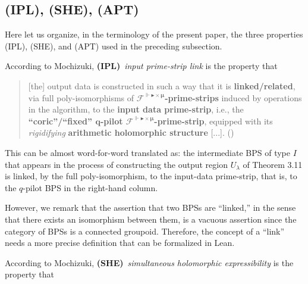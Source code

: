 \documentclass[12pt, reqno, a4paper]{amsart}
\def\cF{{\mathcal{F}}}
\def\bFmrts{\cF^{\Vdash\blacktriangleright\times\bm{\mu}}}
\begin{document}
\subsection{(IPL), (SHE), (APT)}\label{sub:IPLSHEAPTPrecise}
Here let us organize, in the terminology of the present paper, the three properties (IPL), (SHE), and (APT) used in the preceding subsection.

\medskip\noindent
According to Mochizuki, {\bf (IPL)}\ \emph{input prime-strip link} is the property that 

\medskip\begin{quote}
[the] output data is constructed in such a way that it is {\bf
linked/related}, via full poly-isomorphisms of {\bf
$\bFmrts$-prime-strips} induced by operations in the algorithm, to the
{\bf input data prime-strip}, i.e., the {\bf ``coric''/``fixed''
$\bm{q}$-pilot $\bFmrts$-prime-strip}, equipped with its {\it rigidifying}
{\bf arithmetic holomorphic structure} [...]. (\cite[Rem.\ 3.11.1(iii), p.\ 582]{MR4225475})
\end{quote}

\medskip
This can be almost word-for-word translated as: the intermediate BPS of type $I$ that appears in the process of constructing the output region \(U_{\lambda}\) of Theorem 3.11 is linked, by the full poly-isomorphism, to the input-data prime-strip, that is, to the \(q\)-pilot BPS in the right-hand column.


\begin{rem}
However, we remark that the assertion that two BPSs are ``linked,'' in the sense that there exists an isomorphism between them, is a vacuous assertion since the category of BPSs is a connected groupoid. 
Therefore, the concept of a ``link'' needs a more precise definition that can be formalized in Lean.
\end{rem}


\medskip\noindent
According to Mochizuki, {\bf (SHE)}\ \emph{simultaneous holomorphic expressibility} is the property that 
\end{document}
